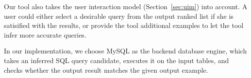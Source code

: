Our tool also takes the user interaction model (Section~\ref{sec:uim}) into account.
A user could either select a desirable query from the output ranked list if she is
satisified with the results, or provide
the tool additional examples to let the tool infer more accurate queries.

In our implementation, we choose MySQL as the backend database engine, which takes an
inferred SQL query candidate, executes it on the input tables, and checks whether the
output result matches the given output example.

